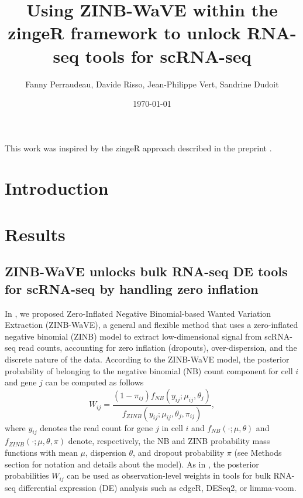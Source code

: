 \documentclass{article}
\title{Using ZINB-WaVE within the zingeR framework to unlock RNA-seq tools for scRNA-seq}
\author{Fanny Perraudeau, Davide Risso, Jean-Philippe Vert, Sandrine Dudoit}
\date{\today}
\begin{document}
\maketitle

\bigskip

This work was inspired by the zingeR approach described in the preprint \cite{VandenBerge2017ZingeR:Applications}.

\section*{Introduction}

\section*{Results}

\subsection*{ZINB-WaVE unlocks bulk RNA-seq DE tools for scRNA-seq by handling zero inflation}

In \cite{Risso2017}, we proposed Zero-Inflated Negative Binomial-based Wanted Variation Extraction (ZINB-WaVE), a general and flexible method that uses a zero-inflated negative binomial (ZINB) model to extract low-dimensional signal from scRNA-seq read counts, accounting for zero inflation (dropouts), over-dispersion, and the discrete nature of the data. According to the ZINB-WaVE model, the posterior probability of belonging to the negative binomial (NB) count component for cell $i$ and gene $j$ can be computed as follows
\begin{equation}W_{ij} = \frac{ ( 1 - \pi_{ij} ) f_{NB}(y_{ij}; \mu_{ij}, \theta_j ) }{f_{ZINB}(y_{ij};\mu_{ij}, \theta_j, \pi_{ij})},
\end{equation}
where $y_{ij}$ denotes the read count for gene $j$ in cell $i$ and $f_{NB}(\cdot; \mu, \theta)$ and $f_{ZINB}(\cdot; \mu, \theta, \pi)$ denote, respectively, the NB and ZINB probability mass functions with mean $\mu$, dispersion $\theta$, and dropout probability $\pi$ (see Methods section for notation and details about the model). As in \cite{VandenBerge2017ZingeR:Applications}, the posterior probabilities $W_{ij}$ can be used as observation-level weights in tools for bulk RNA-seq differential expression (DE) analysis such as edgeR, DESeq2, or limma-voom.\\ 
\end{document}

